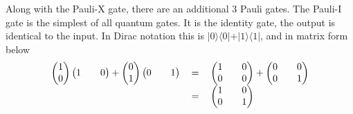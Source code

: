 \documentclass[authoryearcitations]{UoYCSproject}
\begin{document}
Along with the Pauli-X gate, there are an additional 3 Pauli gates.
The Pauli-I gate is the simplest of all quantum gates.
It is the identity gate, the output is identical to the input.
In Dirac notation this is $\vert0\rangle\langle0\vert + \vert1\rangle\langle1\vert$, and in matrix form below
\begin{equation}
\begin{tabular}{ r c l }
\(\begin {pmatrix}
1\\
0
\end{pmatrix}
\begin {pmatrix}
1&&
0
\end{pmatrix}
 + 
\begin {pmatrix}
0\\
1
\end{pmatrix}
\begin {pmatrix}
0&&
1
\end{pmatrix}\)
& \(=\)
& \( 
\begin{pmatrix}
1 && 0 \\
0 && 0
\end{pmatrix}
 + 
\begin{pmatrix}
0 && 0\\
0 && 1
\end{pmatrix}
\) \\
& \(=\)
& \( 
\begin{pmatrix}
1 && 0 \\
0 && 1
\end{pmatrix}
\)
\end{tabular}
\end{equation}
\end{document}
